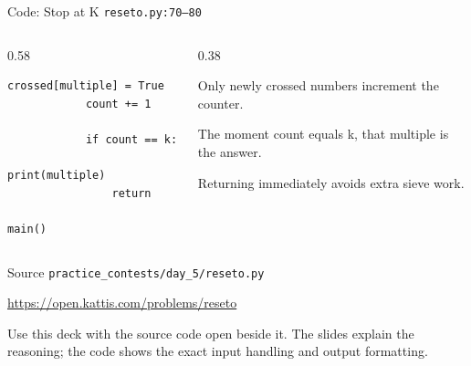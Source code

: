 \documentclass[aspectratio=169,11pt]{beamer}
\begin{document}
\begin{frame}[fragile]{Code: Stop at K}
\scriptsize
{} \texttt{reseto.py:70--80}

\vspace{0.08cm}
\begin{columns}[T,totalwidth=\textwidth]
\begin{column}{0.58\textwidth}
\begin{lstlisting}[style=cpcode]
            crossed[multiple] = True
            count += 1

            if count == k:
                print(multiple)
                return

main()
\end{lstlisting}
\end{column}
\begin{column}{0.38\textwidth}
\begin{tightitemize}
  \item Only newly crossed numbers increment the counter.
  \item The moment count equals k, that multiple is the answer.
  \item Returning immediately avoids extra sieve work.
\end{tightitemize}
\end{column}
\end{columns}
\end{frame}

\begin{frame}{Source}
\small
{} \texttt{practice\_contests/day\_5/reseto.py}

\vspace{0.3cm}
 \url{https://open.kattis.com/problems/reseto}

\vspace{0.45cm}
Use this deck with the source code open beside it. The slides explain the reasoning; the code shows the exact input handling and output formatting.
\end{frame}
\end{document}
